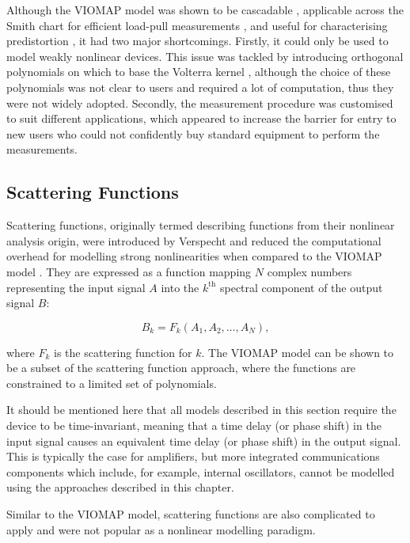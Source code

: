 \documentclass[../thesis/thesis.tex]{subfiles}
\begin{document}
Although the VIOMAP model was shown to be cascadable \cite{Verbeyst_1994}, applicable across the Smith chart for efficient load-pull measurements \cite{Verbeyst_1995b}, and useful for characterising predistortion \cite{Verbeyst_1995}, it had two major shortcomings. Firstly, it could only be used to model weakly nonlinear devices. This issue was tackled by introducing orthogonal polynomials on which to base the Volterra kernel \cite{Verbeyst_1996}, although the choice of these polynomials was not clear to users and required a lot of computation, thus they were not widely adopted. Secondly, the measurement procedure was customised to suit different applications, which appeared to increase the barrier for entry to new users who could not confidently buy standard equipment to perform the measurements.

\subsection{Scattering Functions}

Scattering functions, originally termed describing functions from their nonlinear analysis origin, were introduced by Verspecht and reduced the computational overhead for modelling strong nonlinearities when compared to the VIOMAP model \cite{Verspecht_1996}. They are expressed as a function mapping $N$ complex numbers representing the input signal $A$ into the $k^{\textrm{th}}$ spectral component of the output signal $B$:

\begin{equation}
	B_{k} = F_k(A_1, A_2, \dots, A_N),
	\label{ch5_eqn_scatfunc}
\end{equation}

where $F_k$ is the scattering function for $k$. The VIOMAP model can be shown to be a subset of the scattering function approach, where the functions are constrained to a limited set of polynomials.

It should be mentioned here that all models described in this section require the device to be time-invariant, meaning that a time delay (or phase shift) in the input signal causes an equivalent time delay (or phase shift) in the output signal. This is typically the case for amplifiers, but more integrated communications components which include, for example, internal oscillators, cannot be modelled using the approaches described in this chapter.

Similar to the VIOMAP model, scattering functions are also complicated to apply and were not popular as a nonlinear modelling paradigm.
\end{document}

